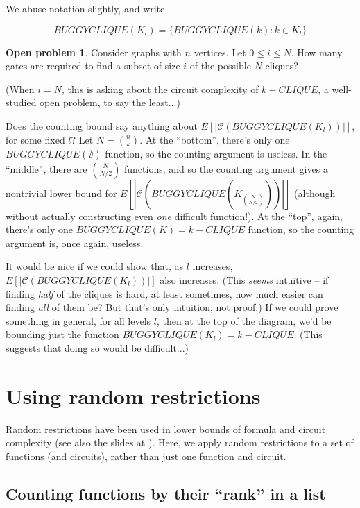\documentclass[12pt]{article}
\theoremstyle{definition}
\newtheorem{prob}{Open problem}[section]
\newcommand{\bigC}[0]{\mathcal{C}}
\begin{document}
We abuse notation slightly, and write

\[
BUGGYCLIQUE(K_l) = \{ BUGGYCLIQUE(k) : k \in K_l \}
\]

\begin{prob}
\label{gatesPerLevel}
Consider graphs with $n$ vertices.
Let $0 \le i \le N$.
How many gates are required to find a subset of size $i$ of the possible $N$
cliques?

\end{prob}

(When $i=N$, this is asking about the circuit complexity of $k-CLIQUE$, a
well-studied open problem, to say the least...)

Does the counting bound
say anything about $E[|\bigC(BUGGYCLIQUE(K_l))|]$, for
some fixed $l$? Let $N = {n \choose k}$.
At the ``bottom'', there's only one $BUGGYCLIQUE(\emptyset)$
function, so the counting argument is useless.
In the ``middle'',
there are ${N \choose {N/2}}$ functions, and so the counting
argument gives a nontrivial lower bound for
$E[|\bigC(BUGGYCLIQUE(K_{N \choose {N/2}}))|]$ (although
without actually constructing even {\em one} difficult function!).
At the ``top'', again, there's only one $BUGGYCLIQUE(K) = k-CLIQUE$
function, so the counting argument is, once again, useless.

It would be nice if we could show that, as $l$ increases,
$E[|\bigC(BUGGYCLIQUE(K_l))|]$ also increases.
(This {\em seems} intuitive -- if finding {\em half} of the cliques
is hard, at least sometimes, how much easier can finding {\em all}
of them be? But that's only intuition, not proof.)
If we could prove something in general, for all levels $l$, then at
the top of the diagram, we'd be bounding just the function
$BUGGYCLIQUE(K_l) = k-CLIQUE$. (This suggests that doing so would
be difficult...)

\section{Using random restrictions}

Random restrictions have been used in lower bounds of formula
\cite{subbotovskaya1963comparison} and circuit \cite{hastad1987lower}
complexity (see also the slides at \cite{rossmanRestrictions}).
Here, we apply random restrictions to a set of functions (and circuits),
rather than just one function and circuit.

\subsection{Counting functions by their ``rank'' in a list}
\end{document}
